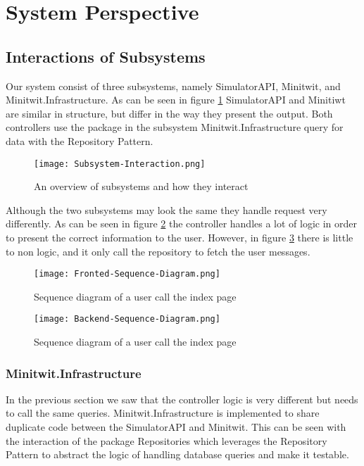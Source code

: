 \section{System Perspective}

\subsection{Interactions of Subsystems}
Our system consist of three subsystems, namely SimulatorAPI, Minitwit, and Minitwit.Infrastructure. As can be seen in figure \ref{fig:subsystem-interaction} SimulatorAPI and Minitiwt are similar in structure, but differ in the way they present the output. Both controllers use the package in the subsystem Minitwit.Infrastructure query for data with the Repository Pattern.

\begin{figure}[H]
    \begin{center}
        \texttt{[image: Subsystem-Interaction.png]}
    \end{center}
    \caption{An overview of subsystems and how they interact}
    \label{fig:subsystem-interaction}
\end{figure}

Although the two subsystems may look the same they handle request very differently. As can be seen in figure \ref{fig:frontend-interaction} the controller handles a lot of logic in order to present the correct information to the user. However, in figure \ref{fig:backend-interaction} there is little to non logic, and it only call the repository to fetch the user messages.
\begin{figure}[H]
    \begin{center}
        \texttt{[image: Fronted-Sequence-Diagram.png]}
    \end{center}
    \caption{Sequence diagram of a user call the index page}
    \label{fig:frontend-interaction}
\end{figure}
\begin{figure}[H]
    \begin{center}
        \texttt{[image: Backend-Sequence-Diagram.png]}
    \end{center}
    \caption{Sequence diagram of a user call the index page}
    \label{fig:backend-interaction}
\end{figure}
\subsubsection{Minitwit.Infrastructure}
In the previous section we saw that the controller logic is very different but needs to call the same queries.
Minitwit.Infrastructure is implemented to share duplicate code between the SimulatorAPI and Minitwit. This can be seen with the interaction of the package Repositories which leverages the Repository Pattern to abstract the logic of handling database queries and make it testable.


